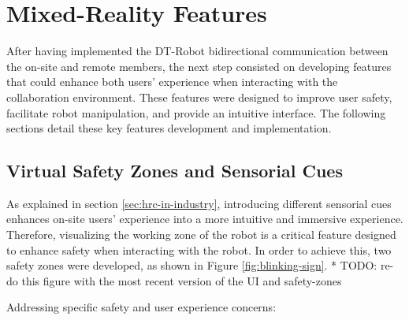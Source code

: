\section{Mixed-Reality Features}
\label{section:on-site-features}
After having implemented the \ac{DT}-Robot bidirectional communication between the on-site and remote members, the next step consisted on developing features that could enhance both users' experience when interacting with the collaboration environment. These features were designed to improve user safety, facilitate robot manipulation, and provide an intuitive interface. The following sections detail these key features development and implementation.


\subsection{Virtual Safety Zones and Sensorial Cues}
\label{subsection:virtual-safety-zones} 

As explained in section \ref{sec:hrc-in-industry}, introducing different sensorial cues enhances on-site users' experience into a more intuitive and immersive experience. Therefore, visualizing the working zone of the robot is a critical feature designed to enhance safety when interacting with the robot. In order to achieve this, two safety zones were developed, as shown in Figure \ref{fig:blinking-sign}. 
* TODO: re-do this figure with the most recent version of the UI and safety-zones


Addressing specific safety and user experience concerns: 

